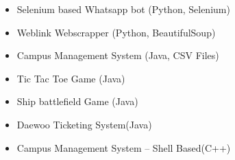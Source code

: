 \documentclass[10pt,a4paper,ragged2e,withhyper]{altacv}
\begin{document}
\begin{paracol}{2}
\begin{itemize}
\item Selenium based Whatsapp bot (Python, Selenium)
\item Weblink Webscrapper (Python, BeautifulSoup)
\item Campus Management System (Java, CSV Files)
\item Tic Tac Toe Game (Java)
\item Ship battlefield Game (Java)
\item Daewoo Ticketing System(Java)
\item Campus Management System -- Shell Based(C++)
\end{itemize}
\divider




\divider\smallskip

\end{paracol}
\end{document}
